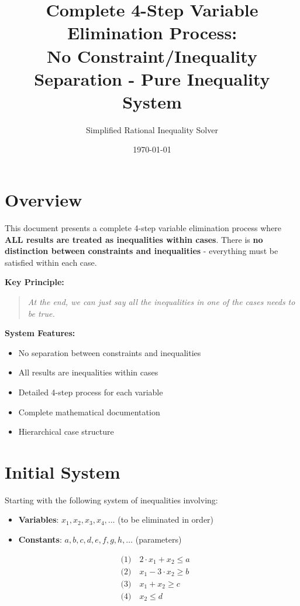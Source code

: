 \documentclass{article}
\title{Complete 4-Step Variable Elimination Process: \\
No Constraint/Inequality Separation - Pure Inequality System}
\author{Simplified Rational Inequality Solver}
\date{\today}
\begin{document}
\maketitle

\section{Overview}

This document presents a complete 4-step variable elimination process where
\textbf{ALL results are treated as inequalities within cases}. There is
\textbf{no distinction between constraints and inequalities} - everything
must be satisfied within each case.

\textbf{Key Principle:}
\begin{quote}
\textit{At the end, we can just say all the inequalities in one of the cases needs to be true.}
\end{quote}

\textbf{System Features:}
\begin{itemize}
\item No separation between constraints and inequalities
\item All results are inequalities within cases
\item Detailed 4-step process for each variable
\item Complete mathematical documentation
\item Hierarchical case structure
\end{itemize}

\section{Initial System}

Starting with the following system of inequalities involving:
\begin{itemize}
\item \textbf{Variables}: $x_1, x_2, x_3, x_4, \ldots$ (to be eliminated in order)
\item \textbf{Constants}: $a, b, c, d, e, f, g, h, \ldots$ (parameters)
\end{itemize}

\begin{align}
& \text{(1)} \quad 2 \cdot x_{1} + x_{2} \leq a \\
& \text{(2)} \quad x_{1} - 3 \cdot x_{2} \geq b \\
& \text{(3)} \quad x_{1} + x_{2} \geq c \\
& \text{(4)} \quad x_{2} \leq d \\
\end{align}
\end{document}
